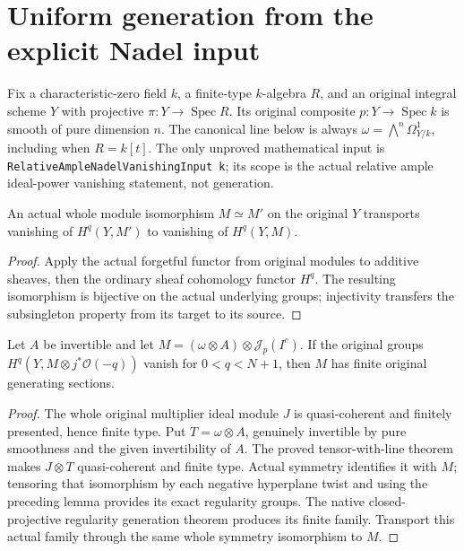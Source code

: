 \section{Uniform generation from the explicit Nadel input}
\label{sec:c0n-uniform-generation}

Fix a characteristic-zero field $k$, a finite-type $k$-algebra $R$, and
an original integral scheme $Y$ with projective $\pi:Y\to\operatorname{Spec}R$.
Its original composite $p:Y\to\operatorname{Spec}k$ is smooth of pure
dimension $n$.  The canonical line below is always
$\omega=\bigwedge^n\Omega^1_{Y/k}$, including when $R=k[t]$.
The only unproved mathematical input is
\nolinkurl{RelativeAmpleNadelVanishingInput k}; its scope is the actual
relative ample ideal-power vanishing statement, not generation.

\begin{lemma}
\label{lem:c0n-uniform-cohomology-iso}
\leanok
An actual whole module isomorphism $M\simeq M'$ on the original $Y$
transports vanishing of $H^q(Y,M')$ to vanishing of $H^q(Y,M)$.
\end{lemma}
\begin{proof}
Apply the actual forgetful functor from original modules to additive
sheaves, then the ordinary sheaf cohomology functor $H^q$.  The resulting
isomorphism is bijective on the actual underlying groups; injectivity
transfers the subsingleton property from its target to its source.
\end{proof}

\begin{lemma}
\label{lem:c0n-multiplier-regularity-consumer}
\leanok
Let $A$ be invertible and let $M=(\omega\otimes A)\otimes\mathcal J_p(I^c)$.
If the original groups $H^q(Y,M\otimes j^*\mathcal O(-q))$ vanish for
$0<q<N+1$, then $M$ has finite original generating sections.
\end{lemma}
\begin{proof}
The whole original multiplier ideal module $J$ is quasi-coherent and
finitely presented, hence finite type.  Put $T=\omega\otimes A$, genuinely
invertible by pure smoothness and the given invertibility of $A$.
The proved tensor-with-line theorem makes $J\otimes T$ quasi-coherent
and finite type.  Actual symmetry identifies it with $M$; tensoring that
isomorphism by each negative hyperplane twist and using the preceding
lemma provides its exact regularity groups.  The native closed-projective
regularity generation theorem produces its finite family.  Transport
this actual family through the same whole symmetry isomorphism to $M$.
\end{proof}

